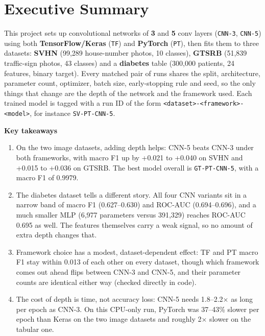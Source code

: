 \documentclass[11pt, a4paper]{article}
\newcommand{\run}[1]{\texttt{#1}}
\begin{document}
\section{Executive Summary}

This project sets up convolutional networks of \textbf{3} and \textbf{5} conv layers
(\run{CNN-3}, \run{CNN-5}) using both \textbf{TensorFlow/Keras} (\run{TF}) and \textbf{PyTorch} (\run{PT}), then fits
them to three datasets: \textbf{SVHN} (99,289 house-number photos, 10 classes), \textbf{GTSRB} (51,839 traffic-sign
photos, 43 classes) and a \textbf{diabetes} table (300,000 patients, 24 features, binary target). Every matched pair of
runs shares the split, architecture, parameter count, optimizer, batch size, early-stopping rule and seed, so the only
things that change are the depth of the network and the framework used. Each trained model is tagged with a run ID of
the form \run{<dataset>-<framework>-<model>}, for instance \run{SV-PT-CNN-5}.

\begin{table}[H]
\centering
\caption{All 12 runs (test set). s/epoch = median training time per epoch, CPU.}
\label{tab:summary}
\small

\end{table}

\textbf{Key takeaways}
\begin{enumerate}
\item On the two image datasets, adding depth helps: CNN-5 beats CNN-3 under both frameworks, with macro F1 up by
  +0.021 to +0.040 on SVHN and +0.015 to +0.036 on GTSRB. The best model overall is \run{GT-PT-CNN-5}, with a
  macro F1 of 0.9979.
\item The diabetes dataset tells a different story. All four CNN variants sit in a narrow band of macro F1
  (0.627--0.630) and ROC-AUC (0.694--0.696), and a much smaller MLP (6,977 parameters versus 391,329) reaches
  ROC-AUC 0.695 as well. The features themselves carry a weak signal, so no amount of extra depth changes that.
\item Framework choice has a modest, dataset-dependent effect: TF and PT macro F1 stay within 0.013 of each other on
  every dataset, though which framework comes out ahead flips between CNN-3 and CNN-5, and their parameter counts are
  identical either way (checked directly in code).
\item The cost of depth is time, not accuracy loss: CNN-5 needs 1.8--2.2$\times$ as long per epoch as CNN-3. On this
  CPU-only run, PyTorch was 37--43\% slower per epoch than Keras on the two image datasets and roughly 2$\times$ slower
  on the tabular one.
\end{enumerate}
\end{document}
